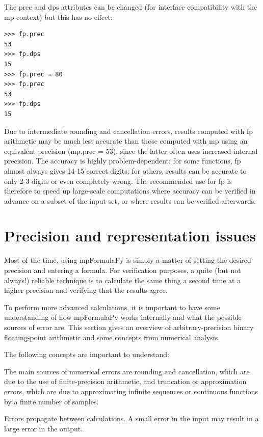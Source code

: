 The prec and dps attributes can be changed (for interface compatibility with the mp context) but this has no effect:

\begin{lstlisting}
>>> fp.prec
53
>>> fp.dps
15
>>> fp.prec = 80
>>> fp.prec
53
>>> fp.dps
15
\end{lstlisting}


Due to intermediate rounding and cancellation errors, results computed with fp arithmetic may be much less accurate than those computed with mp using an equivalent precision (mp.prec = 53), since the latter often uses increased internal precision. The accuracy is highly problem-dependent: for some functions, fp almost always gives 14-15 correct digits; for others, results can be accurate to only 2-3 digits or even completely wrong. The recommended use for fp is therefore to speed up large-scale computations where accuracy can be verified in advance on a subset of the input set, or where results can be verified afterwards.




\newpage
\section{Precision and representation issues}

Most of the time, using mpFormulaPy is simply a matter of setting the desired precision and entering a formula. For verification purposes, a quite (but not always!) reliable technique is to calculate the same thing a second time at a higher precision and verifying that the results
agree.

\vpara
To perform more advanced calculations, it is important to have some understanding of how mpFormulaPy works internally and what the possible sources of error are. This section gives an overview of arbitrary-precision binary floating-point arithmetic and some concepts from
numerical analysis.

\vpara
The following concepts are important to understand:

\vpara
The main sources of numerical errors are rounding and cancellation, which are due to the use of finite-precision arithmetic, and truncation or approximation errors, which are due to approximating infinite sequences or continuous functions by a finite number of samples.

\vpara
Errors propagate between calculations. A small error in the input may result in a large error in the output.

